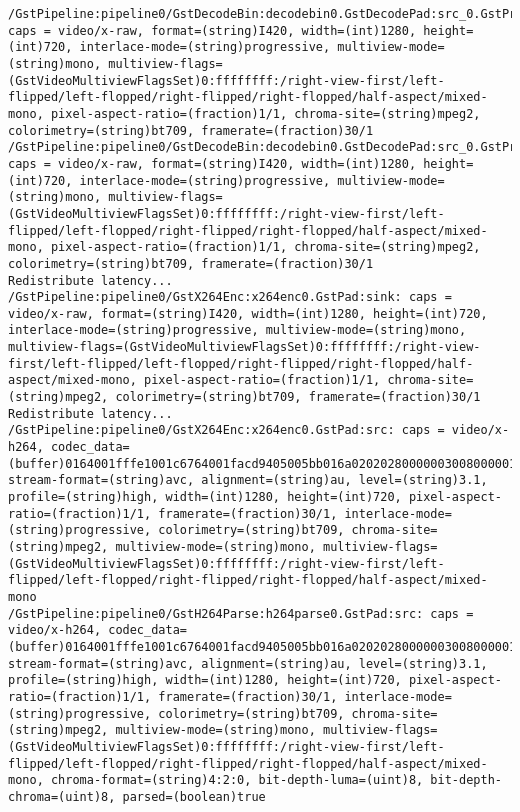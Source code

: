 \documentclass[12pt,oneside]{book}
\begin{document}
\begin{lstlisting}
/GstPipeline:pipeline0/GstDecodeBin:decodebin0.GstDecodePad:src_0.GstProxyPad:proxypad2: caps = video/x-raw, format=(string)I420, width=(int)1280, height=(int)720, interlace-mode=(string)progressive, multiview-mode=(string)mono, multiview-flags=(GstVideoMultiviewFlagsSet)0:ffffffff:/right-view-first/left-flipped/left-flopped/right-flipped/right-flopped/half-aspect/mixed-mono, pixel-aspect-ratio=(fraction)1/1, chroma-site=(string)mpeg2, colorimetry=(string)bt709, framerate=(fraction)30/1
/GstPipeline:pipeline0/GstDecodeBin:decodebin0.GstDecodePad:src_0.GstProxyPad:proxypad2: caps = video/x-raw, format=(string)I420, width=(int)1280, height=(int)720, interlace-mode=(string)progressive, multiview-mode=(string)mono, multiview-flags=(GstVideoMultiviewFlagsSet)0:ffffffff:/right-view-first/left-flipped/left-flopped/right-flipped/right-flopped/half-aspect/mixed-mono, pixel-aspect-ratio=(fraction)1/1, chroma-site=(string)mpeg2, colorimetry=(string)bt709, framerate=(fraction)30/1
Redistribute latency...
/GstPipeline:pipeline0/GstX264Enc:x264enc0.GstPad:sink: caps = video/x-raw, format=(string)I420, width=(int)1280, height=(int)720, interlace-mode=(string)progressive, multiview-mode=(string)mono, multiview-flags=(GstVideoMultiviewFlagsSet)0:ffffffff:/right-view-first/left-flipped/left-flopped/right-flipped/right-flopped/half-aspect/mixed-mono, pixel-aspect-ratio=(fraction)1/1, chroma-site=(string)mpeg2, colorimetry=(string)bt709, framerate=(fraction)30/1
Redistribute latency...
/GstPipeline:pipeline0/GstX264Enc:x264enc0.GstPad:src: caps = video/x-h264, codec_data=(buffer)0164001fffe1001c6764001facd9405005bb016a02020280000003008000001e478c18cb01000568ebecb22c, stream-format=(string)avc, alignment=(string)au, level=(string)3.1, profile=(string)high, width=(int)1280, height=(int)720, pixel-aspect-ratio=(fraction)1/1, framerate=(fraction)30/1, interlace-mode=(string)progressive, colorimetry=(string)bt709, chroma-site=(string)mpeg2, multiview-mode=(string)mono, multiview-flags=(GstVideoMultiviewFlagsSet)0:ffffffff:/right-view-first/left-flipped/left-flopped/right-flipped/right-flopped/half-aspect/mixed-mono
/GstPipeline:pipeline0/GstH264Parse:h264parse0.GstPad:src: caps = video/x-h264, codec_data=(buffer)0164001fffe1001c6764001facd9405005bb016a02020280000003008000001e478c18cb01000568ebecb22c, stream-format=(string)avc, alignment=(string)au, level=(string)3.1, profile=(string)high, width=(int)1280, height=(int)720, pixel-aspect-ratio=(fraction)1/1, framerate=(fraction)30/1, interlace-mode=(string)progressive, colorimetry=(string)bt709, chroma-site=(string)mpeg2, multiview-mode=(string)mono, multiview-flags=(GstVideoMultiviewFlagsSet)0:ffffffff:/right-view-first/left-flipped/left-flopped/right-flipped/right-flopped/half-aspect/mixed-mono, chroma-format=(string)4:2:0, bit-depth-luma=(uint)8, bit-depth-chroma=(uint)8, parsed=(boolean)true

\end{lstlisting}
\end{document}
